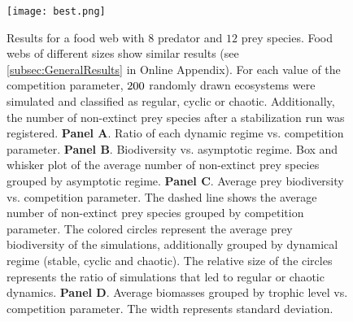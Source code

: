 \begin{figure}
	\begin{center}
		\texttt{[image: best.png]}
	\end{center}
	\caption{Results for a food web with $8$ predator and $12$ prey species. Food webs of different sizes show similar results (see \ref{subsec:GeneralResults} in Online Appendix). For each value of the competition parameter, $200$ randomly drawn ecosystems were simulated and classified as regular, cyclic or chaotic. Additionally, the number of non-extinct prey species after a stabilization run was registered. \textbf{Panel A}. Ratio of each dynamic regime vs. competition parameter. \textbf{Panel B}. Biodiversity vs. asymptotic regime. Box and whisker plot of the average number of non-extinct prey species grouped by asymptotic regime. \textbf{Panel C}. Average prey biodiversity vs. competition parameter. The dashed line shows the average number of non-extinct prey species grouped by competition parameter. The colored circles represent the average prey biodiversity of the simulations, additionally grouped by dynamical regime (stable, cyclic and chaotic). The relative size of the circles represents the ratio of simulations that led to regular or chaotic dynamics. \textbf{Panel D}. Average biomasses grouped by trophic level vs. competition parameter. The width represents standard deviation.}
	\label{fig:Biodiversity}
\end{figure}
